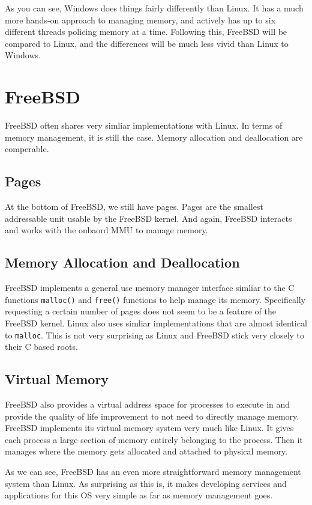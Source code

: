 	As you can see, Windows does things fairly differently than Linux. It has a much
	more hands-on approach to managing memory, and actively has up to six different
	threads policing memory at a time. Following this, FreeBSD will be compared to
	Linux, and the differences will be much less vivid than Linux to Windows.

  \section{FreeBSD}
  FreeBSD often shares very simliar implementations with Linux. In terms of memory
  management, it is still the case. Memory allocation and deallocation are comperable.

  \subsection{Pages}
  At the bottom of FreeBSD, we still have pages. Pages are the smallest addressable
  unit usable by the FreeBSD kernel. And again, FreeBSD interacts and works with the
  onbaord MMU to manage memory.

  \subsection{Memory Allocation and Deallocation}
  FreeBSD implements a general use memory manager interface simliar to the C
  functions \texttt{malloc()} and
  \texttt{free()} functions to help manage its memory. Specifically requesting
  a certain number of pages does not seem to be a feature of the FreeBSD kernel.
  Linux also uses simliar implementations that are almost identical to \texttt{malloc}.
  This is not very surprising as Linux and FreeBSD stick very closely to their C
  based roots. \cite{freebsd2016}

  \subsection{Virtual Memory}
	FreeBSD also provides a virtual address space for processes to execute in
	and provide the quality of life improvement to not need to directly manage
	memory. FreeBSD implements its virtual memory system very much like Linux.
	It gives each process a large section of memory entirely belonging to the
	process. Then it manages where the memory gets allocated and attached to
	physical memory.

  As we can see, FreeBSD has an even more straightforward memory management system
  than Linux. As surprising as this is, it makes developing services and applications
  for this OS very simple as far as memory management goes.

